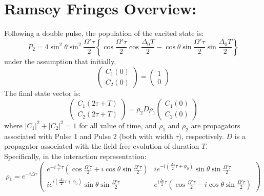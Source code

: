 \documentclass{article}
\begin{document}
\section{Ramsey Fringes Overview:}
\noindent 
Following a double pulse, the population of the excited state is:
\begin{equation*}
\boxed{P_2 = 4\sin^{2}\theta\sin^{2}\frac{\Omega'\tau}{2} \left\lbrace \cos \frac{\Omega'\tau}{2}\cos \frac{\Delta_0 T}{2} - \cos\theta\sin\frac{\Omega'\tau}{2} \sin \frac{\Delta_0 T}{2}\right\rbrace}
\end{equation*}
\noindent 
under the assumption that initially,
\[
\begin{pmatrix}
C_1(0)\\C_2(0)
\end{pmatrix}
=
\begin{pmatrix}
1\\0
\end{pmatrix}
\]
\noindent 
The final state vector is:
\[
\begin{pmatrix}
C_1(2\tau+T)\\C_2(2\tau+T)
\end{pmatrix}
=
\rho_2 D \rho_1
\begin{pmatrix}
C_1(0)\\C_2(0)
\end{pmatrix}
\]
where $|C_1|^2 + |C_2|^2 = 1$ for all value of time, and $\rho_1$ and $\rho_2$ are propagators associated with Pulse 1 and Pulse 2 (both with width $\tau$), respectively. $D$ is a propagator associated with the field-free evolution of duration $T$.\\

\noindent Specifically, in the interaction representation:
\[
\rho_1 = e^{-i\overline\Delta\tau}
\begin{pmatrix}
e^{-i\frac{\Delta_0}{2}\tau}\left(\cos\frac{\Omega'\tau}{2} + i\cos\theta\sin\frac{\Omega'\tau}{2}\right)  
& ie^{-i\left(\frac{\Delta_0}{2}\tau + \phi_0 \right)} \sin\theta\sin\frac{\Omega'\tau}{2} 
\\
ie^{i\left(\frac{\Delta_0}{2}\tau + \phi_0 \right)} \sin\theta\sin\frac{\Omega'\tau}{2} 
& 
e^{i\frac{\Delta_0}{2}\tau}\left(\cos\frac{\Omega'\tau}{2} - i\cos\theta\sin\frac{\Omega'\tau}{2}\right)  
\end{pmatrix}\]
\end{document}
